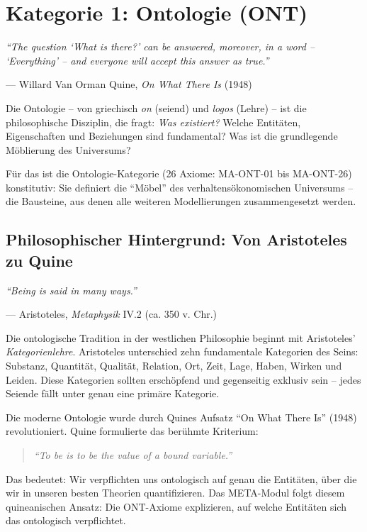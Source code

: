 \section{Kategorie 1: Ontologie (ONT)}

\epigraph{\textit{``The question `What is there?' can be answered, moreover, in a word -- `Everything' -- and everyone will accept this answer as true.''}}{--- Willard Van Orman Quine, \textit{On What There Is} (1948)}

Die Ontologie -- von griechisch \textit{on} (seiend) und \textit{logos} (Lehre) -- ist die philosophische Disziplin, die fragt: \textit{Was existiert?} Welche Entitäten, Eigenschaften und Beziehungen sind fundamental? Was ist die grundlegende Möblierung des Universums?

Für das \BCM{} ist die Ontologie-Kategorie (26 Axiome: MA-ONT-01 bis MA-ONT-26) konstitutiv: Sie definiert die ``Möbel'' des verhaltensökonomischen Universums -- die Bausteine, aus denen alle weiteren Modellierungen zusammengesetzt werden.

\subsection{Philosophischer Hintergrund: Von Aristoteles zu Quine}

\epigraph{\textit{``Being is said in many ways.''}}{--- Aristoteles, \textit{Metaphysik} IV.2 (ca. 350 v. Chr.)}

Die ontologische Tradition in der westlichen Philosophie beginnt mit Aristoteles' \textit{Kategorienlehre}. Aristoteles unterschied zehn fundamentale Kategorien des Seins: Substanz, Quantität, Qualität, Relation, Ort, Zeit, Lage, Haben, Wirken und Leiden. Diese Kategorien sollten erschöpfend und gegenseitig exklusiv sein -- jedes Seiende fällt unter genau eine primäre Kategorie.

Die moderne Ontologie wurde durch Quines Aufsatz ``On What There Is'' (1948) revolutioniert. Quine formulierte das berühmte Kriterium:

\begin{quote}
\textit{``To be is to be the value of a bound variable.''}
\end{quote}

Das bedeutet: Wir verpflichten uns ontologisch auf genau die Entitäten, über die wir in unseren besten Theorien quantifizieren. Das \BCM{} META-Modul folgt diesem quineanischen Ansatz: Die ONT-Axiome explizieren, auf welche Entitäten sich das \BCM{} ontologisch verpflichtet.

